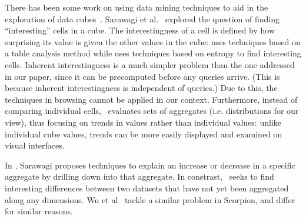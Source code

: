 There has been some  work on using data mining techniques
to aid in the exploration of data 
cubes~\cite{DBLP:conf/vldb/Sarawagi99, DBLP:conf/vldb/SatheS01, DBLP:conf/vldb/Sarawagi00, 
DBLP:conf/SIGKDD/OrdonezC09}.
Sarawagi et al.~\cite{DBLP:conf/EDBT/SarawagiAM98, DBLP:conf/vldb/Sarawagi00} 
 explored 
the question of finding ``interesting'' cells in a cube.
The interestingness of a cell is defined by how surprising
its value is given the other values in the cube:
\cite{DBLP:conf/EDBT/SarawagiAM98} uses techniques 
based on a table analysis method while
\cite{DBLP:conf/vldb/Sarawagi00} uses techniques based on entropy to find interesting cells.
Inherent interestingness is a much simpler problem than the
one addressed in our paper, since it can be precomputed before
any queries arrive. (This is because inherent interestingness is independent of queries.) 
Due to this, 
the techniques in browsing \cite{DBLP:conf/EDBT/SarawagiAM98, 
DBLP:conf/vldb/Sarawagi00} cannot be applied in our context.
Furthermore, instead of comparing individual cells, 
\SeeDB\ evaluates sets of aggregates (i.e. distributions
for our view), thus focusing on trends in values rather than individual values:
unlike individual cube values, trends can be more easily displayed
and examined on visual interfaces.


In \cite{DBLP:conf/vldb/Sarawagi99}, Sarawagi
proposes techniques to explain an
increase or decrease in a specific aggregate by drilling down into that aggregate.
In constrast, \SeeDB\ seeks to find interesting
differences between two datasets that have not yet been aggregated along any dimensions.
Wu et al~\cite{scorpion} tackle a similar problem in Scorpion,
and differ for similar reasons.




